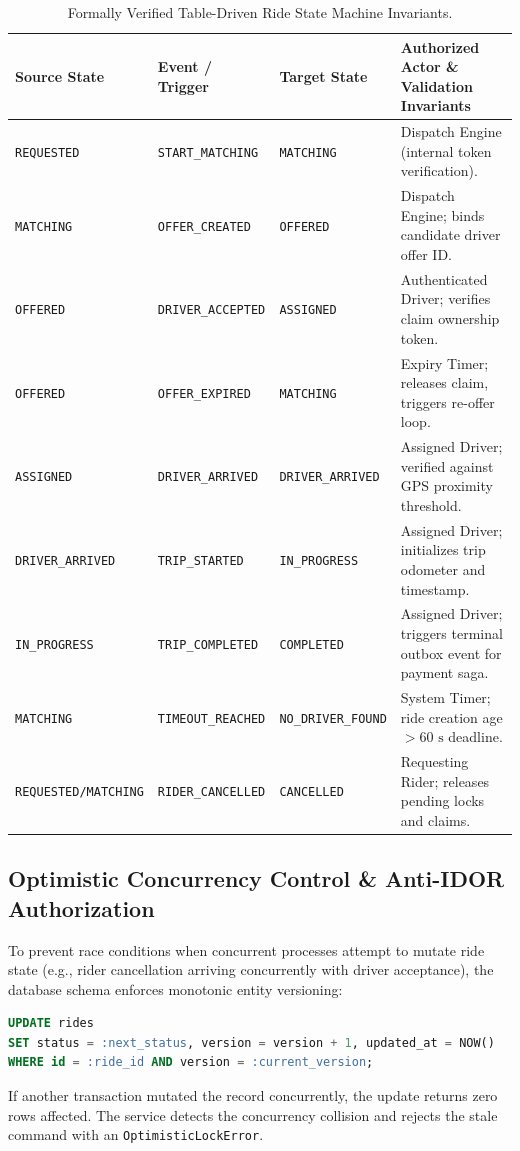 \documentclass[11pt,a4paper]{article}
\begin{document}
\begin{table}[htbp]
\centering
\small
\begin{tabularx}{\textwidth}{l l l X}
\toprule
\textbf{Source State} & \textbf{Event / Trigger} & \textbf{Target State} & \textbf{Authorized Actor \& Validation Invariants} \\
\midrule
\texttt{REQUESTED} & \texttt{START\_MATCHING} & \texttt{MATCHING} & Dispatch Engine (internal token verification). \\
\rowcolor{HexLightBg}
\texttt{MATCHING} & \texttt{OFFER\_CREATED} & \texttt{OFFERED} & Dispatch Engine; binds candidate driver offer ID. \\
\texttt{OFFERED} & \texttt{DRIVER\_ACCEPTED} & \texttt{ASSIGNED} & Authenticated Driver; verifies claim ownership token. \\
\rowcolor{HexLightBg}
\texttt{OFFERED} & \texttt{OFFER\_EXPIRED} & \texttt{MATCHING} & Expiry Timer; releases claim, triggers re-offer loop. \\
\texttt{ASSIGNED} & \texttt{DRIVER\_ARRIVED} & \texttt{DRIVER\_ARRIVED} & Assigned Driver; verified against GPS proximity threshold. \\
\rowcolor{HexLightBg}
\texttt{DRIVER\_ARRIVED} & \texttt{TRIP\_STARTED} & \texttt{IN\_PROGRESS} & Assigned Driver; initializes trip odometer and timestamp. \\
\texttt{IN\_PROGRESS} & \texttt{TRIP\_COMPLETED} & \texttt{COMPLETED} & Assigned Driver; triggers terminal outbox event for payment saga. \\
\rowcolor{HexLightBg}
\texttt{MATCHING} & \texttt{TIMEOUT\_REACHED} & \texttt{NO\_DRIVER\_FOUND} & System Timer; ride creation age $> 60\text{ s}$ deadline. \\
\texttt{REQUESTED/MATCHING} & \texttt{RIDER\_CANCELLED} & \texttt{CANCELLED} & Requesting Rider; releases pending locks and claims. \\
\bottomrule
\end{tabularx}
\caption{Formally Verified Table-Driven Ride State Machine Invariants.}
\label{tab:fsm_transitions}
\end{table}

\subsection{Optimistic Concurrency Control \& Anti-IDOR Authorization}
To prevent race conditions when concurrent processes attempt to mutate ride state (e.g., rider cancellation arriving concurrently with driver acceptance), the database schema enforces monotonic entity versioning:
\begin{lstlisting}[language=SQL]
UPDATE rides 
SET status = :next_status, version = version + 1, updated_at = NOW() 
WHERE id = :ride_id AND version = :current_version;
\end{lstlisting}
If another transaction mutated the record concurrently, the update returns zero rows affected. The service detects the concurrency collision and rejects the stale command with an \texttt{OptimisticLockError}.
\end{document}
